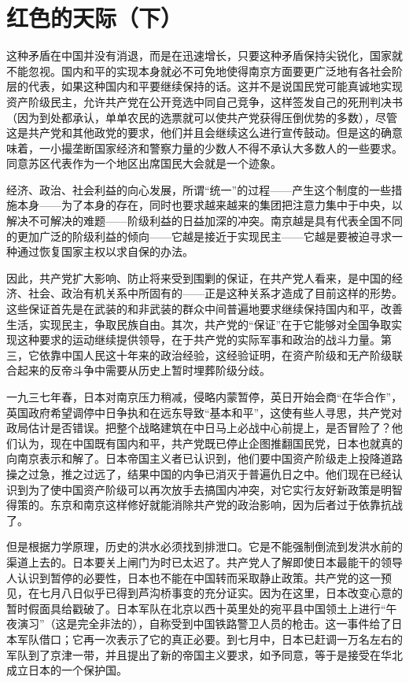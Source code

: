 \documentclass[10pt]{book}
\begin{document}
\section{红色的天际（下）}

这种矛盾在中国并没有消退，而是在迅速增长，只要这种矛盾保持尖锐化，国家就不能忽视。国内和平的实现本身就必不可免地使得南京方面要更广泛地有各社会阶层的代表，如果这种国内和平要继续保持的话。这并不是说国民党可能真诚地实现资产阶级民主，允许共产党在公开竞选中同自己竞争，这样签发自己的死刑判决书（因为到处都承认，单单农民的选票就可以使共产党获得压倒优势的多数），尽管这是共产党和其他政党的要求，他们并且会继续这么进行宣传鼓动。但是这的确意味着，一小撮垄断国家经济和警察力量的少数人不得不承认大多数人的一些要求。同意苏区代表作为一个地区出席国民大会就是一个迹象。

经济、政治、社会利益的向心发展，所谓“统一”的过程——产生这个制度的一些措施本身——为了本身的存在，同时也要求越来越来的集团把注意力集中于中央，以解决不可解决的难题——阶级利益的日益加深的冲突。南京越是具有代表全国不同的更加广泛的阶级利益的倾向——它越是接近于实现民主——它越是要被迫寻求一种通过恢复国家主权以求自保的办法。

因此，共产党扩大影响、防止将来受到围剿的保证，在共产党人看来，是中国的经济、社会、政治有机关系中所固有的——正是这种关系才造成了目前这样的形势。这些保证首先是在武装的和非武装的群众中间普遍地要求继续保持国内和平，改善生活，实现民主，争取民族自由。其次，共产党的“保证”在于它能够对全国争取实现这种要求的运动继续提供领导，在于共产党的实际军事和政治的战斗力量。第三，它依靠中国人民这十年来的政治经验，这经验证明，在资产阶级和无产阶级联合起来的反帝斗争中需要从历史上暂时埋葬阶级分歧。

一九三七年春，日本对南京压力稍减，侵略内蒙暂停，英日开始会商“在华合作”，英国政府希望调停中日争执和在远东导致“基本和平”，这使有些人寻思，共产党对政局估计是否错误。把整个战略建筑在中日马上必战中心前提上，是否冒险了？他们认为，现在中国既有国内和平，共产党既已停止企图推翻国民党，日本也就真的向南京表示和解了。日本帝国主义者已认识到，他们要中国资产阶级走上投降道路操之过急，推之过远了，结果中国的内争已消灭于普遍仇日之中。他们现在已经认识到为了使中国资产阶级可以再次放手去搞国内冲突，对它实行友好新政策是明智得策的。东京和南京这样修好就能消除共产党的政治影响，因为后者过于依靠抗战了。

但是根据力学原理，历史的洪水必须找到排泄口。它是不能强制倒流到发洪水前的渠道上去的。日本要关上闸门为时已太迟了。共产党人了解即使日本最能干的领导人认识到暂停的必要性，日本也不能在中国转而采取静止政策。共产党的这一预见，在七月八日似乎已得到芦沟桥事变的充分证实。因为在这里，日本改变心意的暂时假面具给戳破了。日本军队在北京以西十英里处的宛平县中国领土上进行“午夜演习”（这是完全非法的），自称受到中国铁路警卫人员的枪击。这一事件给了日本军队借口；它再一次表示了它的真正必要。到七月中，日本已赶调一万名左右的军队到了京津一带，并且提出了新的帝国主义要求，如予同意，等于是接受在华北成立日本的一个保护国。
\end{document}
